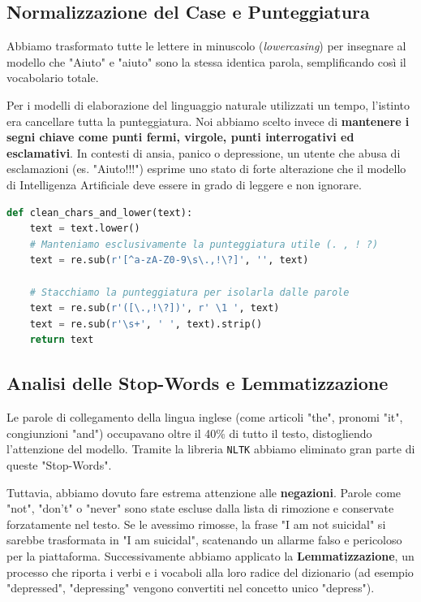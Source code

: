 \subsection{Normalizzazione del Case e Punteggiatura}
Abbiamo trasformato tutte le lettere in minuscolo (\textit{lowercasing}) per insegnare al modello che "Aiuto" e "aiuto" sono la stessa identica parola, semplificando così il vocabolario totale.

Per i modelli di elaborazione del linguaggio naturale utilizzati un tempo, l'istinto era cancellare tutta la punteggiatura. Noi abbiamo scelto invece di \textbf{mantenere i segni chiave come punti fermi, virgole, punti interrogativi ed esclamativi}. In contesti di ansia, panico o depressione, un utente che abusa di esclamazioni (es. "Aiuto!!!") esprime uno stato di forte alterazione che il modello di Intelligenza Artificiale deve essere in grado di leggere e non ignorare.

\begin{lstlisting}[language=Python, caption={Conversione in minuscolo e salvataggio punteggiatura}]
def clean_chars_and_lower(text):
    text = text.lower()
    # Manteniamo esclusivamente la punteggiatura utile (. , ! ?)
    text = re.sub(r'[^a-zA-Z0-9\s\.,!\?]', '', text)
    
    # Stacchiamo la punteggiatura per isolarla dalle parole
    text = re.sub(r'([\.,!\?])', r' \1 ', text)
    text = re.sub(r'\s+', ' ', text).strip()
    return text
\end{lstlisting}

\subsection{Analisi delle Stop-Words e Lemmatizzazione}
Le parole di collegamento della lingua inglese (come articoli "the", pronomi "it", congiunzioni "and") occupavano oltre il 40\% di tutto il testo, distogliendo l'attenzione del modello. Tramite la libreria \texttt{NLTK} abbiamo eliminato gran parte di queste "Stop-Words".

Tuttavia, abbiamo dovuto fare estrema attenzione alle \textbf{negazioni}. Parole come "not", "don't" o "never" sono state escluse dalla lista di rimozione e conservate forzatamente nel testo. Se le avessimo rimosse, la frase "I am not suicidal" si sarebbe trasformata in "I am suicidal", scatenando un allarme falso e pericoloso per la piattaforma. 
Successivamente abbiamo applicato la \textbf{Lemmatizzazione}, un processo che riporta i verbi e i vocaboli alla loro radice del dizionario (ad esempio "depressed", "depressing" vengono convertiti nel concetto unico "depress").

